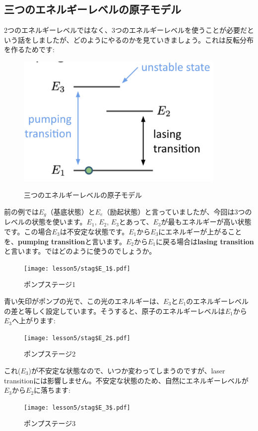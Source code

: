 \subsection{三つのエネルギーレベルの原子モデル}
2つのエネルギーレベルではなく、3つのエネルギーレベルを使うことが必要だという話をしましたが、どのようにやるのかを見ていきましょう。これは反転分布を作るためです:
\begin{figure}[H]
    \centering
    \includegraphics[width=0.9\textwidth]{lesson5/3_atom_annotated.pdf}
    \label{図: 1}
    \caption{三つのエネルギーレベルの原子モデル}
\end{figure}
前の例では$E_g$（基底状態）と$E_e$（励起状態）と言っていましたが、今回は3つのレベルの状態を使います。$E_1$, $E_2$, $E_3$とあって、$E_3$が最もエネルギーが高い状態です。この場合$E_3$は不安定な状態です。$E_1$から$E_3$にエネルギーが上がることを、\textbf{pumping transition}と言います。$E_2$から$E_1$に戻る場合は\textbf{lasing transition}と言います。ではどのように使うのでしょうか。
\begin{figure}[H]
    \centering
    \texttt{[image: lesson5/stag\$E\_1\$.pdf]}
    \label{図: 1}
    \caption{ポンプステージ1}
\end{figure}
青い矢印がポンプの光で、この光のエネルギーは、$E_3$と$E_1$のエネルギーレベルの差と等しく設定しています。そうすると、原子のエネルギーレベルは$E_1$から$E_3$へ上がります:
\begin{figure}[H]
    \centering
    \texttt{[image: lesson5/stag\$E\_2\$.pdf]}
    \label{図: 1}
    \caption{ポンプステージ2}
\end{figure}

これ($E_3$)が不安定な状態なので、いつか変わってしまうのですが、laser transitionには影響しません。不安定な状態のため、自然にエネルギーレベルが$E_3$から$E_2$に落ちます:
\begin{figure}[H]
    \centering
    \texttt{[image: lesson5/stag\$E\_3\$.pdf]}
    \label{図: 1}
    \caption{ポンプステージ3}
\end{figure}

